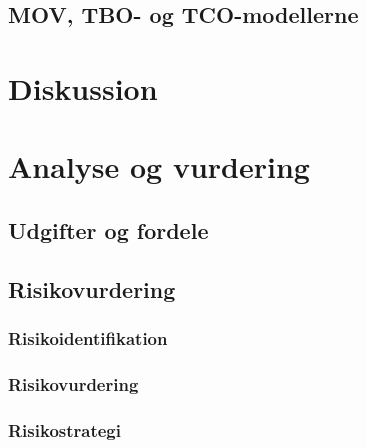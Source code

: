 \documentclass[10pt,a4paper,danish]{article}
\begin{document}
\begin{itemize}
\subsection{MOV, TBO- og TCO-modellerne}

\section{Diskussion}




\section{Analyse og vurdering}



\subsection{Udgifter og fordele}

\subsection{Risikovurdering}




\subsubsection{Risikoidentifikation}

\subsubsection{Risikovurdering}


\subsubsection{Risikostrategi}


\end{itemize}
\end{document}
